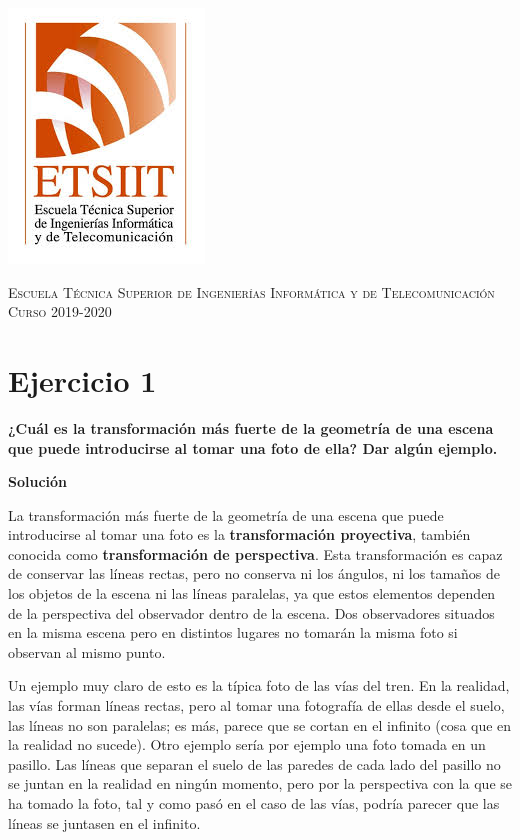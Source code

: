 \documentclass[11pt,a4paper]{article}
\newcommand{\answer}{\noindent\textbf{Solución}}
\newcommand{\question}[1]{\noindent\textbf{#1}}
\newcommand{\nonumsection}[1]{\section*{#1}\addcontentsline{toc}{section}{#1}}
\begin{document}
\begin{titlepage}
\begin{minipage}{\textwidth}
\includegraphics[scale=0.3]{img/etsiit.jpeg}

\vspace{0.7cm}
\textsc{Escuela Técnica Superior de Ingenierías Informática y de Telecomunicación}\\
\vspace{1cm}
\textsc{Curso 2019-2020}
\end{minipage}
\end{titlepage}

\tableofcontents
\thispagestyle{empty}				%

\newpage

\setlength{\parskip}{1em}

\nonumsection{Ejercicio 1}

\question{¿Cuál es la transformación más fuerte de la geometría de una
escena que puede introducirse al tomar una foto de ella? Dar algún
ejemplo.}

\answer

La transformación más fuerte de la geometría de una escena que puede introducirse
al tomar una foto es la \textbf{transformación proyectiva}, también conocida como
\textbf{transformación de perspectiva}. Esta transformación es capaz de conservar
las líneas rectas, pero no conserva ni los ángulos, ni los tamaños de los objetos
de la escena ni las líneas paralelas, ya que estos elementos dependen de la perspectiva
del observador dentro de la escena. Dos observadores situados en la misma escena
pero en distintos lugares no tomarán la misma foto si observan al mismo punto.

Un ejemplo muy claro de esto es la típica foto de las vías del tren. En la realidad,
las vías forman líneas rectas, pero al tomar una fotografía de ellas desde el suelo,
las líneas no son paralelas; es más, parece que se cortan en el infinito (cosa que
en la realidad no sucede). Otro ejemplo sería por ejemplo una foto tomada en un pasillo.
Las líneas que separan el suelo de las paredes de cada lado del pasillo no se juntan
en la realidad en ningún momento, pero por la perspectiva con la que se ha tomado la foto,
tal y como pasó en el caso de las vías, podría parecer que las líneas se juntasen en el
infinito.
\end{document}
